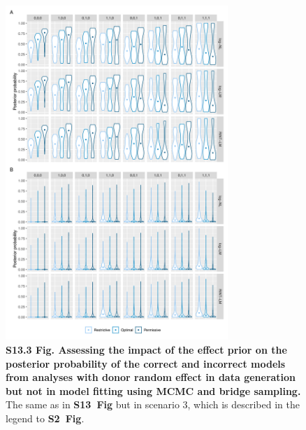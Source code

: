 \documentclass[11pt]{article}
\newcommand{\sfigroccmcmc}{\textbf{S2~Fig}\xspace}
\newcommand{\sfigppeffectone}{\textbf{S13~Fig}\xspace}
\begin{document}
\begin{figure}[!ht]
\begin{center}
  \includegraphics[width=0.75\textwidth]{png/sim_vln_effect_mcmc_bs_ranef_noranef.png}
\end{center}  
\caption{
  {\bf
    S13.3 Fig.
    Assessing the impact of the effect prior on the posterior probability of the correct and incorrect models from analyses with donor random effect in data generation but not in model fitting using MCMC and bridge sampling.}
The same as in \sfigppeffectone but in scenario 3, which is described in the legend to \sfigroccmcmc.
}
\label{s-fig:sim-effect-mcmc-ranef-noranef}
\end{figure}
\end{document}
